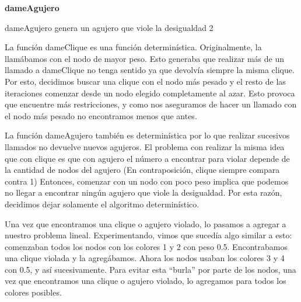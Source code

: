 \documentclass[a4paper, 10pt, twoside]{article}
\begin{document}
\begin{algorithm}[H]
	\textbf{dameAgujero}\\
\caption{dameAgujero genera un agujero que viole la desigualdad 2}
\end{algorithm}


La función dameClique es una función determinística. Originalmente, la llamábamos con el nodo de mayor peso. Esto generaba que realizar más de un llamado a dameClique no tenga sentido ya que devolvía siempre la misma clique. Por esto, decidimos buscar una clique con el nodo más pesado y el resto de las iteraciones comenzar desde un nodo elegido completamente al azar. Esto provoca que encuentre más restricciones, y como nos aseguramos de hacer un llamado con el nodo más pesado no encontramos menos que antes.


La función dameAgujero también es determinística por lo que realizar sucesivos llamados no devuelve nuevos agujeros. El problema con realizar la misma idea que con clique es que con agujero el número a encontrar para violar depende de la cantidad de nodos del agujero (En contraposición, clique siempre compara contra 1) Entonces, comenzar con un nodo con poco peso implica que podemos no llegar a encontrar ningún agujero que viole la desigualdad. Por esta razón, decidimos dejar solamente el algoritmo determinístico.

Una vez que encontramos una clique o agujero violado, lo pasamos a agregar a nuestro problema lineal. Experimentando, vimos que sucedía algo similar a esto: comenzaban todos los nodos con los colores 1 y 2 con peso 0.5. Encontrabamos una clique violada y la agregábamos. Ahora los nodos usaban los colores 3 y 4 con 0.5, y así sucesivamente. Para evitar esta ``burla'' por parte de los nodos, una vez que encontramos una clique o agujero violado, lo agregamos para todos los colores posibles.
\end{document}
